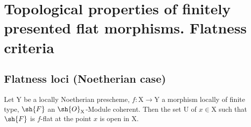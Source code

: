 \section{Topological properties of finitely presented flat morphisms. Flatness criteria}
\label{section:IV.11}


\subsection{Flatness loci (Noetherian case)}
\label{subsection:IV.11.1}


\begin{theorem}[11.1.1]
\label{IV.11.1.1}
Let $\mathrm{Y}$ be a locally Noetherian prescheme, $f:\mathrm{X}\to\mathrm{Y}$ a morphism locally of finite type, $\sh{F}$ an $\sh{O}_\mathrm{X}$-Module coherent. Then the set $\mathrm{U}$ of $x\in\mathrm{X}$ such that $\sh{F}$ is $f$-flat at the point $x$ is open in $\mathrm{X}$.
\end{theorem}


